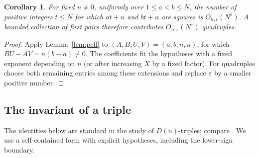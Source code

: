 \documentclass[11pt,a4paper]{article}
\numberwithin{equation}{section}
\newtheorem{corollary}[theorem]{Corollary}
\theoremstyle{remark}
\newcommand{\eps}{\varepsilon}
\begin{document}
\begin{corollary}\label{cor:pair}
For fixed $n\ne0$, uniformly over $1\le a<b\le N$, the number of positive integers $t\le N$ for which $at+n$ and $bt+n$ are squares is $O_{n,\eps}(N^\eps)$. A bounded collection of first pairs therefore contributes $O_{n,\eps}(N^\eps)$ quadruples.
\end{corollary}
\begin{proof}
Apply Lemma~\ref{lem:pell} to $(A,B,U,V)=(a,b,n,n)$, for which $BU-AV=n(b-a)\ne0$. The coefficients fit the hypotheses with a fixed exponent depending on $n$ (or after increasing $X$ by a fixed factor). For quadruples choose both remaining entries among these extensions and replace $\eps$ by a smaller positive number.
\end{proof}

\subsection{The invariant of a triple}
The identities below are standard in the study of $D(n)$-triples; compare \citet{ADDP}. We use a self-contained form with explicit hypotheses, including the lower-sign boundary.
\end{document}

